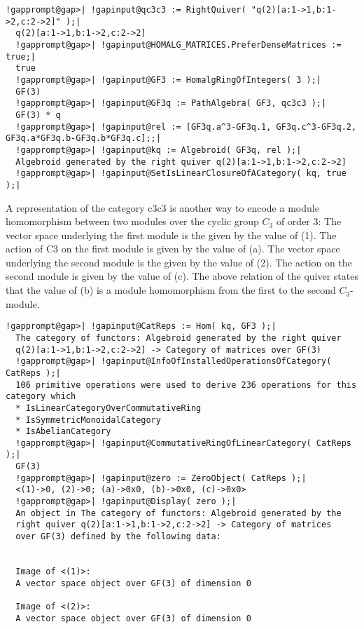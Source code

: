 \documentclass[a4paper,11pt]{report}
\begin{document}
{{{\begin{Verbatim}[commandchars=!@|,fontsize=\small,frame=single,label=Example]
  !gapprompt@gap>| !gapinput@qc3c3 := RightQuiver( "q(2)[a:1->1,b:1->2,c:2->2]" );|
  q(2)[a:1->1,b:1->2,c:2->2]
  !gapprompt@gap>| !gapinput@HOMALG_MATRICES.PreferDenseMatrices := true;|
  true
  !gapprompt@gap>| !gapinput@GF3 := HomalgRingOfIntegers( 3 );|
  GF(3)
  !gapprompt@gap>| !gapinput@GF3q := PathAlgebra( GF3, qc3c3 );|
  GF(3) * q
  !gapprompt@gap>| !gapinput@rel := [GF3q.a^3-GF3q.1, GF3q.c^3-GF3q.2, GF3q.a*GF3q.b-GF3q.b*GF3q.c];;|
  !gapprompt@gap>| !gapinput@kq := Algebroid( GF3q, rel );|
  Algebroid generated by the right quiver q(2)[a:1->1,b:1->2,c:2->2]
  !gapprompt@gap>| !gapinput@SetIsLinearClosureOfACategory( kq, true );|
\end{Verbatim}
 A representation of the category c3c3 is another way to encode a module
homomorphism between two modules over the cyclic group $C_3$ of order $3$: The vector space underlying the first module is the given by the value of
(1). The action of C3 on the first module is given by the value of (a). The
vector space underlying the second module is the given by the value of (2).
The action on the second module is given by the value of (c). The above
relation of the quiver states that the value of (b) is a module homomorphism
from the first to the second $C_3$-module. 
\begin{Verbatim}[commandchars=!@|,fontsize=\small,frame=single,label=Example]
  !gapprompt@gap>| !gapinput@CatReps := Hom( kq, GF3 );|
  The category of functors: Algebroid generated by the right quiver
  q(2)[a:1->1,b:1->2,c:2->2] -> Category of matrices over GF(3)
  !gapprompt@gap>| !gapinput@InfoOfInstalledOperationsOfCategory( CatReps );|
  106 primitive operations were used to derive 236 operations for this category which
  * IsLinearCategoryOverCommutativeRing
  * IsSymmetricMonoidalCategory
  * IsAbelianCategory
  !gapprompt@gap>| !gapinput@CommutativeRingOfLinearCategory( CatReps );|
  GF(3)
  !gapprompt@gap>| !gapinput@zero := ZeroObject( CatReps );|
  <(1)->0, (2)->0; (a)->0x0, (b)->0x0, (c)->0x0>
  !gapprompt@gap>| !gapinput@Display( zero );|
  An object in The category of functors: Algebroid generated by the
  right quiver q(2)[a:1->1,b:1->2,c:2->2] -> Category of matrices
  over GF(3) defined by the following data:
  
  
  Image of <(1)>:
  A vector space object over GF(3) of dimension 0
  
  Image of <(2)>:
  A vector space object over GF(3) of dimension 0
  

\end{Verbatim}}}}
\end{document}
